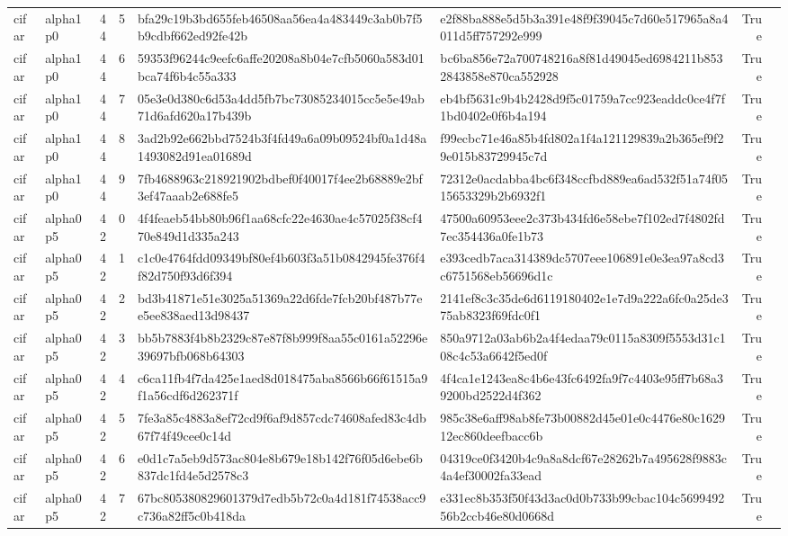 \begin{tabular}{llrrllrl}
cifar & alpha1p0 & 44 & 5 & bfa29c19b3bd655feb46508aa56ea4a483449c3ab0b7f5b9cdbf662ed92fe42b & e2f88ba888e5d5b3a391e48f9f39045c7d60e517965a8a4011d5ff757292e999 & True &  \\
cifar & alpha1p0 & 44 & 6 & 59353f96244c9eefc6affe20208a8b04e7cfb5060a583d01bca74f6b4c55a333 & bc6ba856e72a700748216a8f81d49045ed6984211b8532843858e870ca552928 & True &  \\
cifar & alpha1p0 & 44 & 7 & 05e3e0d380c6d53a4dd5fb7bc73085234015cc5e5e49ab71d6afd620a17b439b & eb4bf5631c9b4b2428d9f5c01759a7cc923eaddc0ce4f7f1bd0402e0f6b4a194 & True &  \\
cifar & alpha1p0 & 44 & 8 & 3ad2b92e662bbd7524b3f4fd49a6a09b09524bf0a1d48a1493082d91ea01689d & f99ecbc71e46a85b4fd802a1f4a121129839a2b365ef9f29e015b83729945c7d & True &  \\
cifar & alpha1p0 & 44 & 9 & 7fb4688963c218921902bdbef0f40017f4ee2b68889e2bf3ef47aaab2e688fe5 & 72312e0acdabba4bc6f348ccfbd889ea6ad532f51a74f0515653329b2b6932f1 & True &  \\
cifar & alpha0p5 & 42 & 0 & 4f4feaeb54bb80b96f1aa68cfc22e4630ae4c57025f38cf470e849d1d335a243 & 47500a60953eee2c373b434fd6e58ebe7f102ed7f4802fd7ec354436a0fe1b73 & True &  \\
cifar & alpha0p5 & 42 & 1 & c1c0e4764fdd09349bf80ef4b603f3a51b0842945fe376f4f82d750f93d6f394 & e393cedb7aca314389dc5707eee106891e0e3ea97a8cd3c6751568eb56696d1c & True &  \\
cifar & alpha0p5 & 42 & 2 & bd3b41871e51e3025a51369a22d6fde7fcb20bf487b77ee5ee838aed13d98437 & 2141ef8c3c35de6d6119180402e1e7d9a222a6fc0a25de375ab8323f69fdc0f1 & True &  \\
cifar & alpha0p5 & 42 & 3 & bb5b7883f4b8b2329c87e87f8b999f8aa55c0161a52296e39697bfb068b64303 & 850a9712a03ab6b2a4f4edaa79c0115a8309f5553d31c108c4c53a6642f5ed0f & True &  \\
cifar & alpha0p5 & 42 & 4 & c6ca11fb4f7da425e1aed8d018475aba8566b66f61515a9f1a56cdf6d262371f & 4f4ca1e1243ea8c4b6e43fc6492fa9f7c4403e95ff7b68a39200bd2522d4f362 & True &  \\
cifar & alpha0p5 & 42 & 5 & 7fe3a85c4883a8ef72cd9f6af9d857cdc74608afed83c4db67f74f49cee0c14d & 985c38e6aff98ab8fe73b00882d45e01e0c4476e80c162912ec860deefbacc6b & True &  \\
cifar & alpha0p5 & 42 & 6 & e0d1c7a5eb9d573ac804e8b679e18b142f76f05d6ebe6b837dc1fd4e5d2578c3 & 04319ce0f3420b4c9a8a8dcf67e28262b7a495628f9883c4a4ef30002fa33ead & True &  \\
cifar & alpha0p5 & 42 & 7 & 67bc805380829601379d7edb5b72c0a4d181f74538acc9c736a82ff5c0b418da & e331ec8b353f50f43d3ac0d0b733b99cbac104c569949256b2ccb46e80d0668d & True &  \\

\end{tabular}
